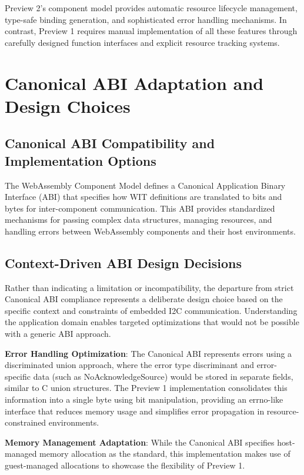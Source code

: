 Preview 2's component model provides automatic resource lifecycle management, type-safe binding generation, and sophisticated error handling mechanisms. In contrast, Preview 1 requires manual implementation of all these features through carefully designed function interfaces and explicit resource tracking systems.

\section{Canonical ABI Adaptation and Design Choices}
\label{sec:canonical-abi-adaptation}

\subsection{Canonical ABI Compatibility and Implementation Options}

The WebAssembly Component Model defines a Canonical Application Binary Interface (ABI) that specifies how WIT definitions are translated to bits and bytes for inter-component communication. This ABI provides standardized mechanisms for passing complex data structures, managing resources, and handling errors between WebAssembly components and their host environments.

\subsection{Context-Driven ABI Design Decisions}

Rather than indicating a limitation or incompatibility, the departure from strict Canonical ABI compliance represents a deliberate design choice based on the specific context and constraints of embedded I2C communication. Understanding the application domain enables targeted optimizations that would not be possible with a generic ABI approach.

\textbf{Error Handling Optimization}: The Canonical ABI represents errors using a discriminated union approach, where the error type discriminant and error-specific data (such as NoAcknowledgeSource) would be stored in separate fields, similar to C union structures. The Preview 1 implementation consolidates this information into a single byte using bit manipulation, providing an errno-like interface that reduces memory usage and simplifies error propagation in resource-constrained environments.

\textbf{Memory Management Adaptation}: While the Canonical ABI specifies host-managed memory allocation as the standard, this implementation makes use of guest-managed allocations to showcase the flexibility of Preview 1.

